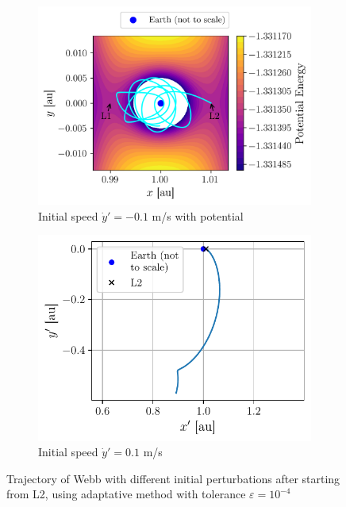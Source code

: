 \begin{figure}[h]
    \centering
    \begin{subfigure}{0.53\linewidth}
        \centering
        \includegraphics[width=\linewidth]{figures/potential_L1_L2_zoom_trajectory.png}
        \caption{Initial speed \(\dot y' = -0.1\) m/s with potential}
        \label{fig:lagrange_trajectory_potential}
    \end{subfigure}
    \begin{subfigure}{0.45\linewidth}
        \centering
        \includegraphics[width=\linewidth]{figures/lagrange_v0_up.pdf}
        \caption{Initial speed \(\dot y' = 0.1\) m/s}
        \label{fig:lagrange_v0_up}
    \end{subfigure}
    \caption{Trajectory of Webb with different initial perturbations after starting from L2, using adaptative method with tolerance \(\varepsilon = 10^{-4}\)}
\end{figure}

